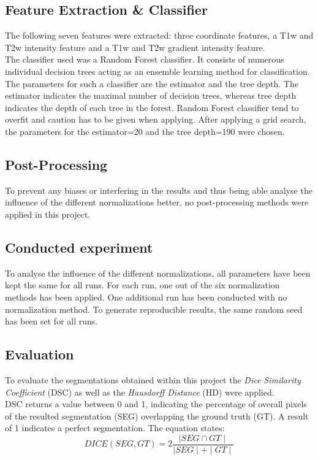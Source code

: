 \documentclass[article]{IEEEtran}
\begin{document}
\subsection{Feature Extraction \& Classifier} 
	The following seven features were extracted: three coordinate features, a T1w and T2w intensity feature and a T1w and T2w gradient intensity feature.\\
	The classifier used was a Random Forest classifier. It consists of numerous individual decision trees acting as an ensemble learning method for classification.
	The parameters for such a classifier are the estimator and the tree depth. The estimator indicates the maximal number of decision trees, whereas tree depth indicates the depth of each tree in the forest.
	Random Forest classifier tend to overfit and caution has to be given when applying.
	After applying a grid search, the parameters for the estimator=20 and the tree depth=190 were chosen. 
	
	
\subsection{Post-Processing} 
	To prevent any biases or interfering in the results and thus being able analyse the influence of the different normalizations better, no post-processing methods were applied in this project. 
	
	
\subsection{Conducted experiment}
	To analyse the influence of the different normalizations, all parameters have been kept the same for all runs. 
	For each run, one out of the six normalization methods has been applied. One additional run has been conducted with no normalization method.
	To generate reproducible results, the same random seed has been set for all runs.  
	
\subsection{Evaluation}
	To evaluate the segmentations obtained within this project the {\itshape Dice Similarity Coefficient} (DSC) as well as the {\itshape Hausdorff Distance} (HD) were applied.\\
	DSC returns a value between 0 and 1, indicating the percentage of overall pixels of the resulted segmentation (SEG) overlapping the ground truth (GT). 
	A result of 1 indicates a perfect segmentation. The equation states: 
	\begin{equation}
		DICE(SEG, GT) = 2 \frac{\mid SEG \cap GT \mid}{\mid SEG \mid + \mid GT \mid}
	\end{equation}
\end{document}
